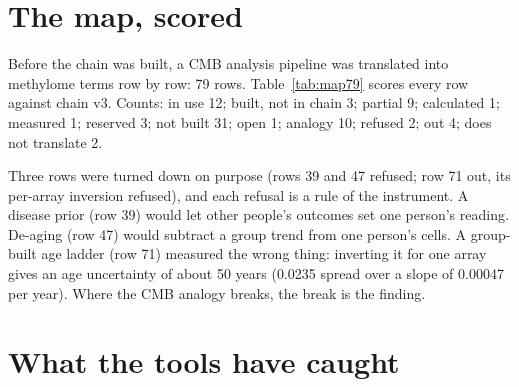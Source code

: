 \section{The map, scored}

Before the chain was built, a CMB analysis pipeline was translated into methylome terms row by row: 79 rows. Table~\ref{tab:map79} scores every row against chain v3. Counts: in use 12; built, not in chain 3; partial 9; calculated 1; measured 1; reserved 3; not built 31; open 1; analogy 10; refused 2; out 4; does not translate 2. \observed



Three rows were turned down on purpose (rows 39 and 47 refused; row 71 out, its per-array inversion refused), and each refusal is a rule of the instrument. A disease prior (row 39) would let other people's
outcomes set one person's reading. De-aging (row 47) would subtract a group trend from one person's cells. A group-built age ladder (row
71) measured the wrong thing: inverting it for one array gives an age uncertainty of about 50 years (0.0235 spread over a slope of 0.00047 per year). \calc{} Where the CMB analogy breaks, the break is
the finding.

\section{What the tools have caught}

